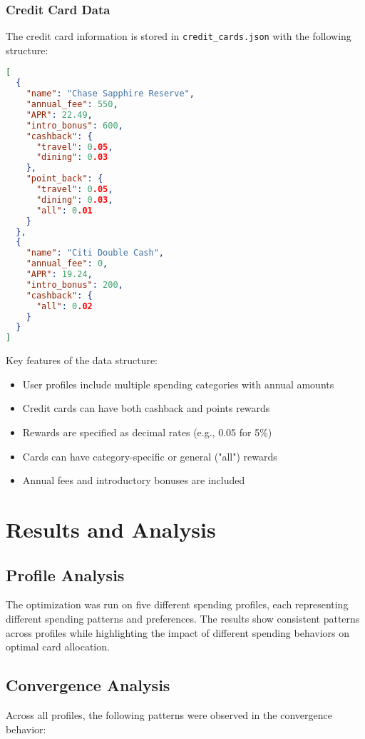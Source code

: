 \documentclass{article}
\begin{document}
\subsubsection{Credit Card Data}
The credit card information is stored in \texttt{credit\_cards.json} with the following structure:
\begin{lstlisting}[language=json]
[
  {
    "name": "Chase Sapphire Reserve",
    "annual_fee": 550,
    "APR": 22.49,
    "intro_bonus": 600,
    "cashback": {
      "travel": 0.05,
      "dining": 0.03
    },
    "point_back": {
      "travel": 0.05,
      "dining": 0.03,
      "all": 0.01
    }
  },
  {
    "name": "Citi Double Cash",
    "annual_fee": 0,
    "APR": 19.24,
    "intro_bonus": 200,
    "cashback": {
      "all": 0.02
    }
  }
]
\end{lstlisting}

Key features of the data structure:
\begin{itemize}
    \item User profiles include multiple spending categories with annual amounts
    \item Credit cards can have both cashback and points rewards
    \item Rewards are specified as decimal rates (e.g., 0.05 for 5\%)
    \item Cards can have category-specific or general ("all") rewards
    \item Annual fees and introductory bonuses are included
\end{itemize}

\section{Results and Analysis}
\subsection{Profile Analysis}
The optimization was run on five different spending profiles, each representing different spending patterns and preferences. The results show consistent patterns across profiles while highlighting the impact of different spending behaviors on optimal card allocation.

\subsection{Convergence Analysis}
Across all profiles, the following patterns were observed in the convergence behavior:
\end{document}
